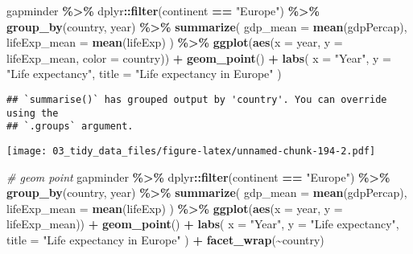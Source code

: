 \documentclass[
]{book}
\newenvironment{Shaded}{\begin{snugshade}}{\end{snugshade}}
\newcommand{\CommentTok}[1]{\textcolor[rgb]{0.56,0.35,0.01}{\textit{#1}}}
\newcommand{\DataTypeTok}[1]{\textcolor[rgb]{0.13,0.29,0.53}{#1}}
\newcommand{\KeywordTok}[1]{\textcolor[rgb]{0.13,0.29,0.53}{\textbf{#1}}}
\newcommand{\NormalTok}[1]{#1}
\newcommand{\OperatorTok}[1]{\textcolor[rgb]{0.81,0.36,0.00}{\textbf{#1}}}
\newcommand{\StringTok}[1]{\textcolor[rgb]{0.31,0.60,0.02}{#1}}
\begin{document}
\begin{Shaded}
\begin{Highlighting}[]
\NormalTok{gapminder }\OperatorTok{\%\textgreater{}\%}
\StringTok{  }\NormalTok{dplyr}\OperatorTok{::}\KeywordTok{filter}\NormalTok{(continent }\OperatorTok{==}\StringTok{ "Europe"}\NormalTok{) }\OperatorTok{\%\textgreater{}\%}
\StringTok{  }\KeywordTok{group\_by}\NormalTok{(country, year) }\OperatorTok{\%\textgreater{}\%}
\StringTok{  }\KeywordTok{summarize}\NormalTok{(}
    \DataTypeTok{gdp\_mean =} \KeywordTok{mean}\NormalTok{(gdpPercap),}
    \DataTypeTok{lifeExp\_mean =} \KeywordTok{mean}\NormalTok{(lifeExp)}
\NormalTok{  ) }\OperatorTok{\%\textgreater{}\%}
\StringTok{  }\KeywordTok{ggplot}\NormalTok{(}\KeywordTok{aes}\NormalTok{(}\DataTypeTok{x =}\NormalTok{ year, }\DataTypeTok{y =}\NormalTok{ lifeExp\_mean, }\DataTypeTok{color =}\NormalTok{ country)) }\OperatorTok{+}
\StringTok{  }\KeywordTok{geom\_point}\NormalTok{() }\OperatorTok{+}
\StringTok{  }\KeywordTok{labs}\NormalTok{(}
    \DataTypeTok{x =} \StringTok{"Year"}\NormalTok{,}
    \DataTypeTok{y =} \StringTok{"Life expectancy"}\NormalTok{,}
    \DataTypeTok{title =} \StringTok{"Life expectancy in Europe"}
\NormalTok{  )}
\end{Highlighting}
\end{Shaded}

\begin{verbatim}
## `summarise()` has grouped output by 'country'. You can override using the
## `.groups` argument.
\end{verbatim}

\texttt{[image: 03\_tidy\_data\_files/figure-latex/unnamed-chunk-194-2.pdf]}

\begin{Shaded}
\begin{Highlighting}[]
\CommentTok{\# geom point}
\NormalTok{gapminder }\OperatorTok{\%\textgreater{}\%}
\StringTok{  }\NormalTok{dplyr}\OperatorTok{::}\KeywordTok{filter}\NormalTok{(continent }\OperatorTok{==}\StringTok{ "Europe"}\NormalTok{) }\OperatorTok{\%\textgreater{}\%}
\StringTok{  }\KeywordTok{group\_by}\NormalTok{(country, year) }\OperatorTok{\%\textgreater{}\%}
\StringTok{  }\KeywordTok{summarize}\NormalTok{(}
    \DataTypeTok{gdp\_mean =} \KeywordTok{mean}\NormalTok{(gdpPercap),}
    \DataTypeTok{lifeExp\_mean =} \KeywordTok{mean}\NormalTok{(lifeExp)}
\NormalTok{  ) }\OperatorTok{\%\textgreater{}\%}
\StringTok{  }\KeywordTok{ggplot}\NormalTok{(}\KeywordTok{aes}\NormalTok{(}\DataTypeTok{x =}\NormalTok{ year, }\DataTypeTok{y =}\NormalTok{ lifeExp\_mean)) }\OperatorTok{+}
\StringTok{  }\KeywordTok{geom\_point}\NormalTok{() }\OperatorTok{+}
\StringTok{  }\KeywordTok{labs}\NormalTok{(}
    \DataTypeTok{x =} \StringTok{"Year"}\NormalTok{,}
    \DataTypeTok{y =} \StringTok{"Life expectancy"}\NormalTok{,}
    \DataTypeTok{title =} \StringTok{"Life expectancy in Europe"}
\NormalTok{  ) }\OperatorTok{+}
\StringTok{  }\KeywordTok{facet\_wrap}\NormalTok{(}\OperatorTok{\textasciitilde{}}\NormalTok{country)}
\end{Highlighting}
\end{Shaded}
\end{document}
